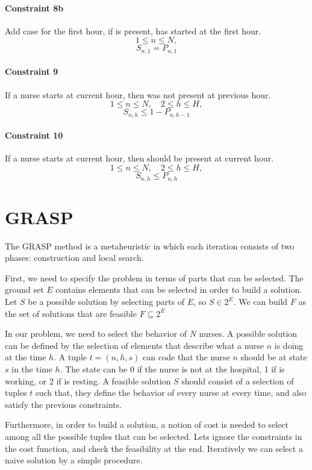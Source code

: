 \documentclass[12pt,a4paper]{article}
\begin{document}
\paragraph{Constraint 8b} Add case for the first hour, if is present, has 
started at the first hour.
$$ 1 \le n \le N,$$
$$ S_{n, 1} = P_{n, 1} $$
%
\paragraph{Constraint 9} If a nurse starts at current hour, then was not
present at previous hour.
$$ 1 \le  n \le N ,\quad 2 \le h \le H,$$
$$ S_{n,h} \le 1 - P_{n, h-1} $$
%
\paragraph{Constraint 10} If a nurse starts at current hour, then should be
present at current hour.
$$ 1 \le n \le N,\quad 2 \le h \le H,$$
$$ S_{n,h} \le P_{n, h} $$
%
%
\section{GRASP}
%
The GRASP method is a metaheuristic in which each iteration consists of two 
phases: construction and local search.

First, we need to specify the problem in terms of parts that can be selected.  
The ground set $E$ contains elements that can be selected in order to build a 
solution. Let $S$ be a possible solution by selecting parts of $E$, so $S \in 
2^E$. We can build $F$ as the set of solutions that are feasible $F \subseteq 
2^E$

In our problem, we need to select the behavior of $N$ nurses. A possible 
solution can be defined by the selection of elements that describe what a nurse 
$n$ is doing at the time $h$. A tuple $t = (n, h, s)$ can code that the nurse 
$n$ should be at state $s$ in the time $h$. The state can be 0 if the nurse is 
not at the hospital, 1 if is working, or 2 if is resting. A feasible solution 
$S$ should consist of a selection of tuples $t$ such that, they define the 
behavior of every nurse at every time, and also satisfy the previous 
constraints.

Furthermore, in order to build a solution, a notion of cost is needed to select 
among all the possible tuples that can be selected. Lets ignore the constraints 
in the cost function, and check the feasibility at the end. Iteratively we can 
select a naive solution by a simple procedure.
\end{document}
